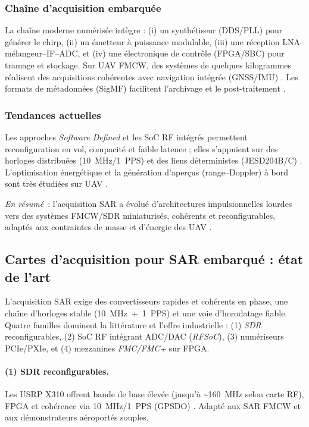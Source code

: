 \subsubsection{Chaîne d’acquisition embarquée}

La chaîne moderne numérisée intègre : (i) un synthétiseur (DDS/PLL) pour générer le chirp, (ii) un émetteur à puissance modulable, (iii) une réception LNA--mélangeur--IF--ADC, et (iv) une électronique de contrôle (FPGA/SBC) pour tramage et stockage. Sur UAV FMCW, des systèmes de quelques kilogrammes réalisent des acquisitions cohérentes avec navigation intégrée (GNSS/IMU) \cite{Aguasca2013_ARBRES_UAV_SAR,Svedin2021_UAVSAR}. Les formats de métadonnées (SigMF) facilitent l’archivage et le post-traitement \cite{Balister2017_SigMF}.

\subsubsection{Tendances actuelles}

Les approches \textit{Software Defined} et les SoC RF intégrés permettent reconfiguration en vol, compacité et faible latence ; elles s’appuient sur des horloges distribuées (10~MHz/1~PPS) et des liens déterministes (JESD204B/C) \cite{AMD_RFSoC_DS889,ADI_JESD204B_Survival}. L’optimisation énergétique et la génération d’aperçus (range--Doppler) à bord sont très étudiées sur UAV \cite{Svedin2021_UAVSAR,Sun2020_PassiveUAVSAR}.

\vspace{0.5em}
\noindent\textit{En résumé}~: l’acquisition SAR a évolué d’architectures impulsionnelles lourdes vers des systèmes FMCW/SDR miniaturisés, cohérents et reconfigurables, adaptés aux contraintes de masse et d’énergie des UAV \cite{Aguasca2013_ARBRES_UAV_SAR,Svedin2021_UAVSAR}.

\subsection{Cartes d'acquisition pour SAR embarqué : état de l'art}

L’acquisition SAR exige des convertisseurs rapides et cohérents en phase, une chaîne d’horloges stable (10~MHz~+~1~PPS) et une voie d’horodatage fiable. Quatre familles dominent la littérature et l’offre industrielle : (1) \textit{SDR} reconfigurables, (2) SoC RF intégrant ADC/DAC (\textit{RFSoC}), (3) numériseurs PCIe/PXIe, et (4) mezzanines \textit{FMC/FMC+} sur FPGA.

\paragraph{(1) SDR reconfigurables.}
Les USRP X310 offrent bande de base élevée (jusqu’à \textasciitilde160~MHz selon carte RF), FPGA et cohérence via 10~MHz/1~PPS (GPSDO) \cite{Ettus_X310_Spec}. Adapté aux SAR FMCW et aux démonstrateurs aéroportés souples.

